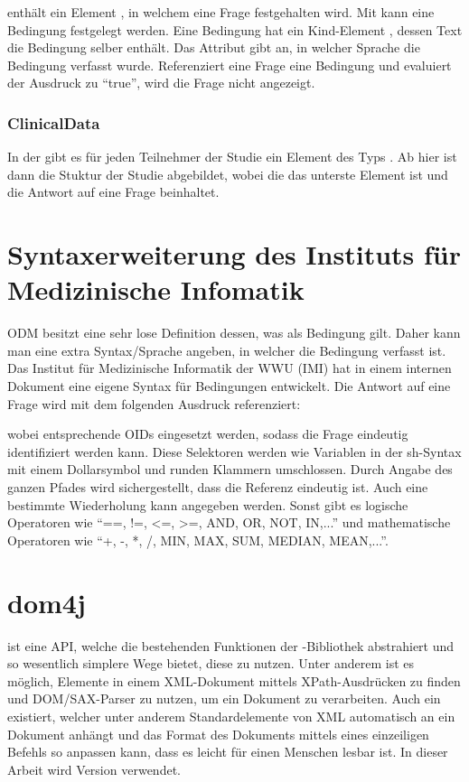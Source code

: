  enthält ein Element , in welchem eine Frage festgehalten wird.
Mit  kann eine Bedingung festgelegt werden.
Eine Bedingung hat ein Kind-Element , dessen Text die Bedingung selber enthält.
Das Attribut  gibt an, in welcher Sprache die Bedingung verfasst wurde.
Referenziert eine Frage eine Bedingung und evaluiert der Ausdruck zu \enquote{true}, wird die Frage nicht angezeigt.

\subsubsection{ClinicalData}

In der  gibt es für jeden Teilnehmer der Studie ein Element des Typs .
Ab hier ist dann die Stuktur der Studie abgebildet, wobei die  das unterste Element ist und die Antwort auf eine Frage beinhaltet.

\section{Syntaxerweiterung des Instituts für Medizinische Infomatik}

ODM besitzt eine sehr lose Definition dessen, was als Bedingung gilt. Daher kann man eine extra Syntax/Sprache angeben, in welcher die Bedingung verfasst ist.
Das Institut für Medizinische Informatik der WWU (IMI) hat in einem internen Dokument eine eigene Syntax für Bedingungen entwickelt.
Die Antwort auf eine Frage wird mit dem folgenden Ausdruck referenziert: 


\noindent wobei entsprechende OIDs eingesetzt werden, sodass die Frage eindeutig identifiziert werden kann.
Diese Selektoren werden wie Variablen in der sh-Syntax mit einem Dollarsymbol und runden Klammern umschlossen.
Durch Angabe des ganzen Pfades wird sichergestellt, dass die Referenz eindeutig ist. Auch eine bestimmte Wiederholung kann angegeben werden.
Sonst gibt es logische Operatoren wie \enquote{==, !=, <=, >=, AND, OR, NOT, IN,...} und mathematische Operatoren wie \enquote{+, -, *, /, MIN, MAX, SUM, MEDIAN, MEAN,...}.

\section{dom4j}

 ist eine API, welche die bestehenden Funktionen der -Bibliothek abstrahiert und so wesentlich simplere Wege bietet, diese zu nutzen\cite{dom4j}.
Unter anderem ist es möglich, Elemente in einem XML-Dokument mittels XPath-Ausdrücken zu finden und DOM/SAX-Parser zu nutzen, um ein Dokument zu verarbeiten.
Auch ein  existiert, welcher unter anderem Standardelemente von XML automatisch an ein Dokument anhängt und das Format des Dokuments mittels eines einzeiligen Befehls so anpassen kann, dass es leicht für einen Menschen lesbar ist.
In dieser Arbeit wird Version  verwendet.

